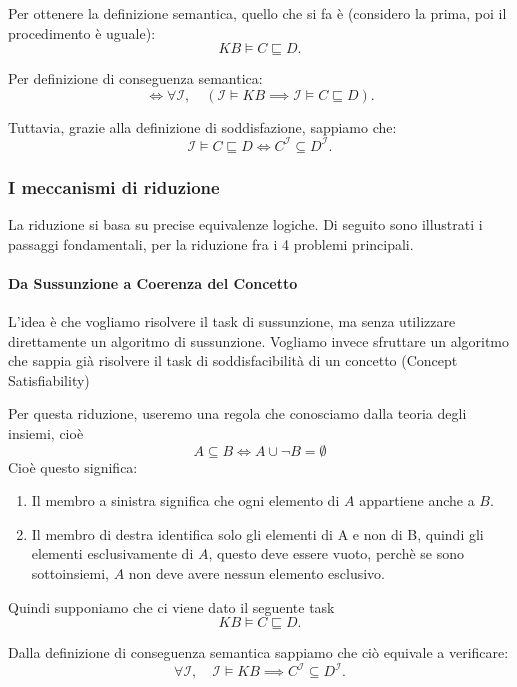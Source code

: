 \begin{observation}
    Per ottenere la definizione semantica, quello che si fa è (considero la prima, poi il procedimento è uguale):
    \[
KB\models C\sqsubseteq D.
\]

Per definizione di conseguenza semantica:
\[
\iff
\forall\mathcal I,\quad
(\mathcal I\models KB\implies
\mathcal I\models C\sqsubseteq D).
\]

Tuttavia, grazie alla definizione di soddisfazione, sappiamo che:
\[
\mathcal I\models C\sqsubseteq D
\iff
C^{\mathcal I}\subseteq D^{\mathcal I}.
\]
\end{observation}

\subsubsection{I meccanismi di riduzione}
La riduzione si basa su precise equivalenze logiche. Di seguito sono illustrati i passaggi
fondamentali, per la riduzione fra i 4 problemi principali. 
\paragraph{Da Sussunzione a Coerenza del Concetto}
L'idea è che vogliamo risolvere il task di sussunzione, ma senza utilizzare direttamente un algoritmo di sussunzione. Vogliamo invece sfruttare un algoritmo che sappia già risolvere il task di soddisfacibilità di un concetto (Concept Satisfiability)
\begin{observation}{}
    Per questa riduzione, useremo una regola che conosciamo dalla teoria degli insiemi, cioè
    \[
    A \subseteq B \Leftrightarrow A \cup \neg B = \emptyset
    \]
    Cioè questo significa:
    \begin{enumerate}
        \item Il membro a sinistra significa che ogni elemento di $A$ appartiene anche a $B$.
        \item Il membro di destra identifica solo gli elementi di A e non di B, quindi gli elementi esclusivamente di $A$, questo deve essere vuoto, perchè se sono sottoinsiemi, $A$ non deve avere nessun elemento esclusivo.
    \end{enumerate}
\end{observation}
Quindi supponiamo che ci viene dato il seguente task
\[
KB\models C\sqsubseteq D.
\]

Dalla definizione di conseguenza semantica sappiamo che ciò equivale a verificare:
\[
\forall\mathcal I,\quad
\mathcal I\models KB
\implies C^{\mathcal I}\subseteq D^{\mathcal I}.
\]

